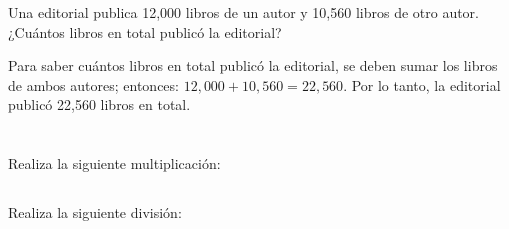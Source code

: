 \documentclass[12pt,addpoints]{evalua}
\begin{document}
\begin{questions}
    \question[10] Una editorial publica 12,000 libros de un autor y 10,560 libros de otro autor. ¿Cuántos libros en total publicó la editorial?
    \begin{solutionbox}{2.5cm}
        Para saber cuántos libros en total publicó la editorial, se deben sumar los libros de ambos autores; entonces: $12,000+10,560=22,560$.
        Por lo tanto, la editorial publicó 22,560 libros en total.
    \end{solutionbox}

    \section*{\else{}\fi}
    \begin{multicols}{2}
        \subsection*{\else{}\fi}
        \question[4] Realiza la siguiente multiplicación:
        \begin{multicols}{2}
        \end{multicols}

        \subsection*{\else{}\fi}

        \question[4] Realiza la siguiente división:
        \begin{multicols}{2}
        \end{multicols}


\end{multicols}
\end{questions}
\end{document}
